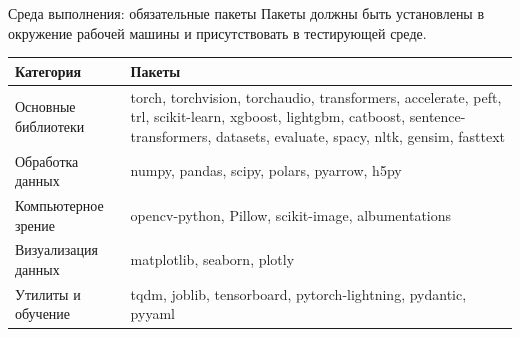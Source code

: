 \begin{frame}{Среда выполнения: обязательные пакеты\orient}
  \vspace{0.2em}
  {\footnotesize\color{acGray}Пакеты должны быть установлены в окружение
  рабочей машины и присутствовать в тестирующей среде.}
  \vspace{0.6em}

  \footnotesize
  \begin{tabular}{@{}p{}p{}@{}}
    \toprule
    \textbf{Категория} & \textbf{Пакеты}\\
    \midrule
    Основные библиотеки &
      \ttfamily torch, torchvision, torchaudio, transformers, accelerate, peft, trl,
      scikit-learn, xgboost, lightgbm, catboost, sentence-transformers, datasets,
      evaluate, spacy, nltk, gensim, fasttext\\
    \addlinespace[0.3em]
    Обработка данных &
      \ttfamily numpy, pandas, scipy, polars, pyarrow, h5py\\
    \addlinespace[0.3em]
    Компьютерное зрение &
      \ttfamily opencv-python, Pillow, scikit-image, albumentations\\
    \addlinespace[0.3em]
    Визуализация данных &
      \ttfamily matplotlib, seaborn, plotly\\
    \addlinespace[0.3em]
    Утилиты и обучение &
      \ttfamily tqdm, joblib, tensorboard, pytorch-lightning, pydantic, pyyaml\\
    \bottomrule
  \end{tabular}
\end{frame}

